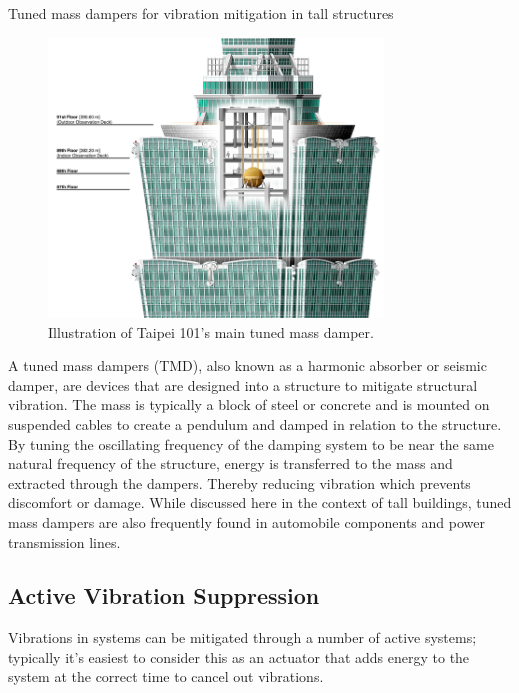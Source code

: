 \documentclass[12pt,letter]{article}
\begin{document}
\begin{vibration_case_study}
	Tuned mass dampers for vibration mitigation in tall structures
	\begin{figure}[H]
		\centering
		\includegraphics[width=3.5in]{../figures/Taipei_101_Tuned_Mass_Damper.png}
		\caption{Illustration of Taipei 101's main tuned mass damper. \protect\footnotemark[1]}
	\end{figure}
	
	A tuned mass dampers (TMD), also known as a harmonic absorber or seismic damper, are devices that are designed into a structure to mitigate structural vibration. The mass is typically a block of steel or concrete and is mounted on suspended cables to create a pendulum and damped in relation to the structure. By tuning the oscillating frequency of the damping system to be near the same natural frequency of the structure, energy is transferred to the mass and extracted through the dampers. Thereby reducing vibration which prevents discomfort or damage. While discussed here in the context of tall buildings, tuned mass dampers are also frequently found in automobile components and power transmission lines.	
	
\end{vibration_case_study}



\subsection{Active Vibration Suppression}

Vibrations in systems can be mitigated through a number of active systems; typically it's easiest to consider this as an actuator that adds energy to the system at the correct time to cancel out vibrations. 
\end{document}

